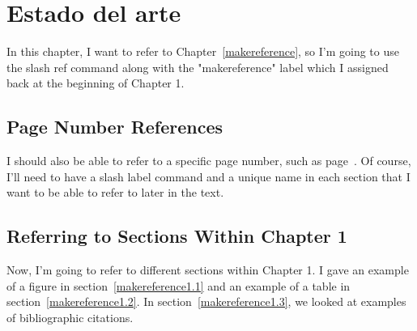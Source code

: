 
\cleardoublepage


\chapter{Estado del arte}
\label{makereference2}

In this chapter, I want to refer to Chapter~\ref{makereference},
so I'm going to use the slash ref command along with the
"makereference" label which I assigned back at the beginning of
Chapter 1.

\section{Page Number References}
\label{makereference2.1} I should also be able to refer to a
specific page number, such as page~\pageref{makereference}.  Of
course, I'll need to have a slash label command and a unique name
in each section that I want to be able to refer to later in the
text.

\section{Referring to Sections Within Chapter 1}
\label{makereference2.2} Now, I'm going to refer to different
sections within Chapter 1. I gave an example of a figure in
section~\ref{makereference1.1} and an example of a table in
section~\ref{makereference1.2}.  In
section~\ref{makereference1.3}, we looked at examples of
bibliographic citations.
